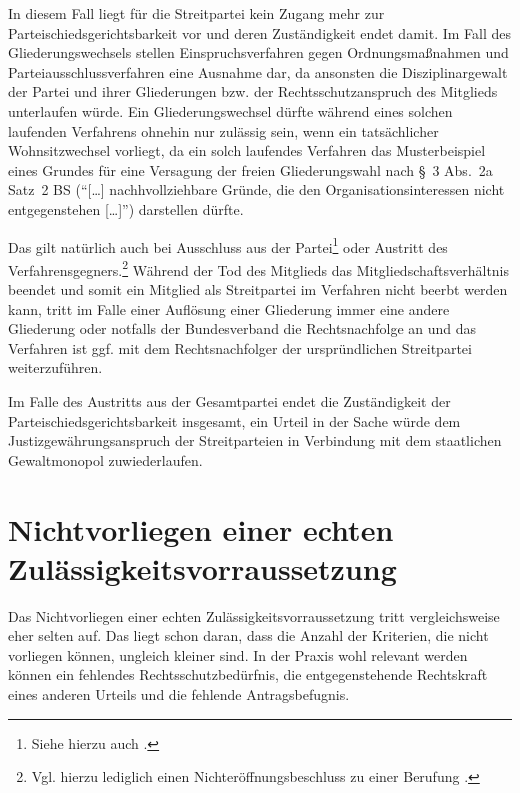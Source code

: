 In diesem Fall liegt für die Streitpartei kein Zugang mehr zur Parteischiedsgerichtsbarkeit vor und deren Zuständigkeit endet damit.
Im Fall des Gliederungswechsels stellen Einspruchsverfahren gegen Ordnungsmaßnahmen und Parteiausschlussverfahren eine Ausnahme dar, da ansonsten die Disziplinargewalt der Partei und ihrer Gliederungen bzw. der Rechtsschutzanspruch des Mitglieds unterlaufen würde.
Ein Gliederungswechsel dürfte während eines solchen laufenden Verfahrens ohnehin nur zulässig sein, wenn ein tatsächlicher Wohnsitzwechsel vorliegt, da ein solch laufendes Verfahren das Musterbeispiel eines Grundes für eine Versagung der freien Gliederungswahl nach \S~3 Abs.~2a Satz~2 BS (\enquote{[\dots] nachhvollziehbare Gründe, die den Organisationsinteressen nicht entgegenstehen [\dots]}) darstellen dürfte.

Das gilt natürlich auch bei Ausschluss aus der Partei\footnote{Siehe hierzu auch \cite{BSG2314HS}.} oder Austritt des Verfahrensgegners.\footnote{Vgl. hierzu lediglich einen Nichteröffnungsbeschluss zu einer Berufung \cite{BSG2214HS}.}
Während der Tod des Mitglieds das Mitgliedschaftsverhältnis beendet und somit ein Mitglied als Streitpartei im Verfahren nicht beerbt werden kann, tritt im Falle einer Auflösung einer Gliederung immer eine andere Gliederung oder notfalls der Bundesverband die Rechtsnachfolge an und das Verfahren ist ggf. mit dem Rechtsnachfolger der urspründlichen Streitpartei weiterzuführen.

Im Falle des Austritts aus der Gesamtpartei endet die Zuständigkeit der Parteischiedsgerichtsbarkeit insgesamt, ein Urteil in der Sache würde dem Justizgewährungsanspruch der Streitparteien in Verbindung mit dem staatlichen Gewaltmonopol zuwiederlaufen.

\section{Nichtvorliegen einer echten Zulässigkeitsvorraussetzung}
\label{Zulaessigkeit:Nichtvorliegen}
Das Nichtvorliegen einer echten Zulässigkeitsvorraussetzung tritt vergleichsweise eher selten auf.
Das liegt schon daran, dass die Anzahl der Kriterien, die nicht vorliegen können, ungleich kleiner sind.
In der Praxis wohl relevant werden können ein fehlendes Rechtsschutzbedürfnis, die entgegenstehende Rechtskraft eines anderen Urteils und die fehlende Antragsbefugnis.

